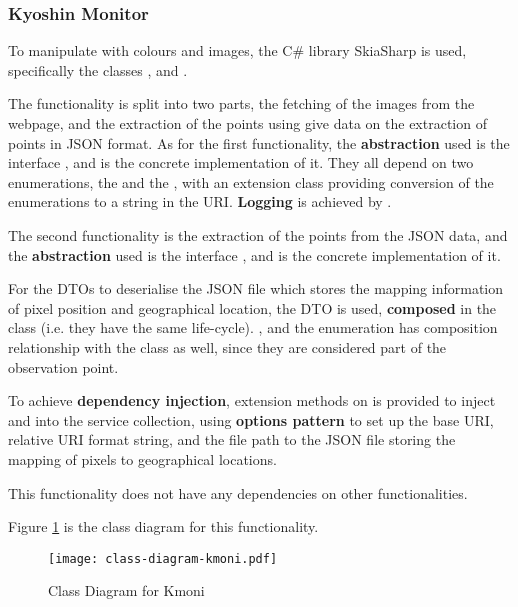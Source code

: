 \subsubsection{Kyoshin Monitor}

To manipulate with colours and images, the C\# library SkiaSharp is used, specifically the classes ,  and .

The functionality is split into two parts, the fetching of the images from the webpage, and the extraction of the points using give data on the extraction of points in JSON format. As for the first functionality, the \textbf{abstraction} used is the interface , and  is the concrete implementation of it. They all depend on two enumerations, the  and the , with an extension class providing conversion of the enumerations to a string in the URI. \textbf{Logging} is achieved by .

The second functionality is the extraction of the points from the JSON data, and the \textbf{abstraction} used is the interface , and  is the concrete implementation of it.

For the DTOs to deserialise the JSON file which stores the mapping information of pixel position and geographical location, the DTO  is used, \textbf{composed} in the class  (i.e. they have the same life-cycle). ,  and the enumeration  has composition relationship with the  class as well, since they are considered part of the observation point.

To achieve \textbf{dependency injection}, extension methods on  is provided to inject  and  into the service collection, using \textbf{options pattern} to set up the base URI, relative URI format string, and the file path to the JSON file storing the mapping of pixels to geographical locations.

This functionality does not have any dependencies on other functionalities.

Figure \ref{fig:class-diagram-kmoni} is the class diagram for this functionality.

\begin{figure}[htp]
    \centering
    \texttt{[image: class-diagram-kmoni.pdf]}
    \caption{Class Diagram for Kmoni}
    \label{fig:class-diagram-kmoni}
\end{figure}


